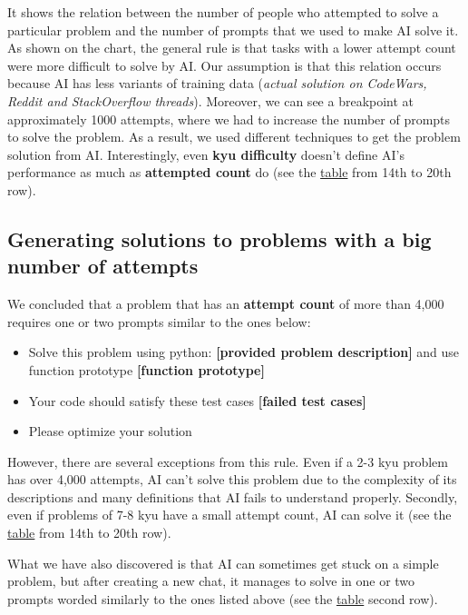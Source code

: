 \documentclass[12pt]{report}
\begin{document}
	It shows the relation between the number of people who attempted to solve a particular problem and the number of prompts that we used to make AI solve it. As shown on the chart, the general rule is that tasks with a lower attempt count were more difficult to solve by AI. Our assumption is that this relation occurs because AI has less variants of training data (\textit{actual solution on CodeWars, Reddit and StackOverflow threads}). Moreover, we can see a breakpoint at approximately 1000 attempts, where we had to increase the number of prompts to solve the problem. As a result, we used different techniques to get the problem solution from AI. Interestingly, even \textbf{kyu difficulty} doesn't define AI's performance as much as \textbf{attempted count} do (see the \href{https://docs.google.com/spreadsheets/d/1qXPyAJsOOpmtxIoGqObwG5mTaLU3IWO0SQRGbjZPhEc/edit#gid=0}{table} from 14th to 20th row).

	\subsection{Generating solutions to problems with a big number of attempts}

		We concluded that a problem that has an \textbf{attempt count} of more than 4,000 requires one or two prompts similar to the ones below:

		\begin{itemize}
			\itemsep0em
			\item Solve this problem using python: \textbf{[provided problem description]} and use function prototype \textbf{[function prototype]}
		   \item Your code should satisfy these test cases \textbf{[failed test cases]}
		   \item Please optimize your solution
		\end{itemize}

		However, there are several exceptions from this rule. Even if a 2-3 kyu problem has over 4,000 attempts, AI can't solve this problem due to the complexity of its descriptions and many definitions that AI fails to understand properly. Secondly, even if problems of 7-8 kyu have a small attempt count, AI can solve it (see the \href{https://docs.google.com/spreadsheets/d/1qXPyAJsOOpmtxIoGqObwG5mTaLU3IWO0SQRGbjZPhEc/edit#gid=0}{table} from 14th to 20th row).

	   What we have also discovered is that AI can sometimes get stuck on a simple problem, but after creating a new chat, it manages to solve in one or two prompts worded similarly to the ones listed above (see the \href{https://docs.google.com/spreadsheets/d/1qXPyAJsOOpmtxIoGqObwG5mTaLU3IWO0SQRGbjZPhEc/edit#gid=0}{table} second row).
\end{document}
